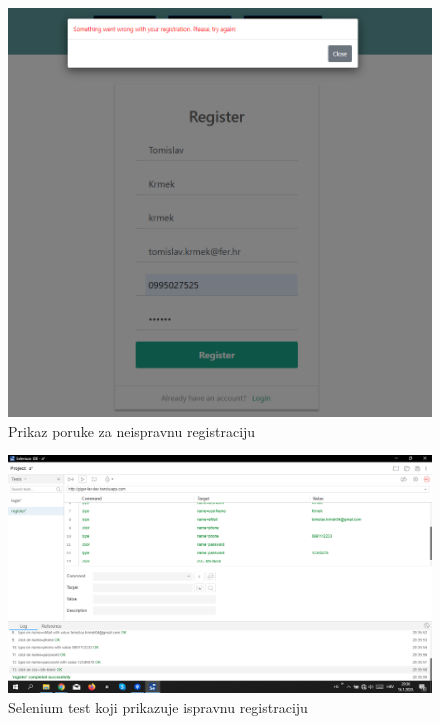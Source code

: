 				\begin{figure}[H]
		 			\begin{center}
		 				\includegraphics[width=15cm]{slike/neispravna_forma_registracija.PNG}
		 			\end{center}
		 			\caption{Prikaz poruke za neispravnu registraciju}
		 			\label{fig:inttest}
		 		\end{figure}
	 		
	 			\begin{figure}[H]
	 				\begin{center}
	 					\includegraphics[width=15cm]{slike/selenium_register.PNG}
	 				\end{center}
	 				\caption{Selenium test koji prikazuje ispravnu registraciju}
	 				\label{fig:selreg}
	 			\end{figure}
 			
